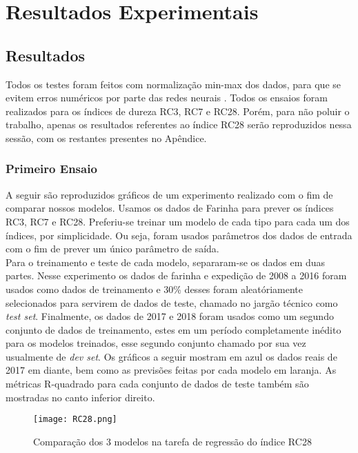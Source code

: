 \chapter{Resultados Experimentais }
\label{cap:resultados}

\section{Resultados}


Todos os testes foram feitos com normalização min-max dos dados, para que se
evitem erros numéricos por parte das redes neurais \citep{dlbook}. Todos os ensaios
foram realizados para os índices de dureza RC3, RC7 e RC28. Porém, para não
poluir o trabalho, apenas os
resultados referentes ao índice RC28 serão reproduzidos nessa sessão, com os
restantes presentes no Apêndice.\\


\subsection{Primeiro Ensaio}
A seguir são reproduzidos gráficos de um experimento realizado com o fim de
comparar nossos modelos. Usamos os dados de Farinha para prever os índices RC3,
RC7 e RC28. Preferiu-se treinar um modelo de cada tipo para cada um dos
índices, por simplicidade. Ou seja, foram usados parâmetros dos dados de entrada
com o fim de prever um único parâmetro de saída. \\ 
Para o treinamento e teste de cada modelo, separaram-se os dados em duas partes. Nesse experimento os dados de farinha e expedição de 2008 a 2016 foram usados como dados de treinamento e 30\% desses foram aleatóriamente selecionados para servirem de dados de teste, chamado no jargão técnico como \textit{test set}. Finalmente, os dados de 2017 e 2018 foram usados como um segundo conjunto de dados de treinamento, estes em um período completamente inédito para os modelos treinados, esse segundo conjunto chamado por sua vez usualmente de \textit{dev set}. Os gráficos a seguir mostram em azul os dados reais de 2017 em diante, bem como as previsões feitas por cada modelo em laranja. As métricas R-quadrado para cada conjunto de dados de teste também são mostradas no canto inferior direito.

\begin{figure}[H]
\centering
\texttt{[image: RC28.png]}
\caption{Comparação dos 3 modelos na tarefa de regressão do índice RC28}
\end{figure}

